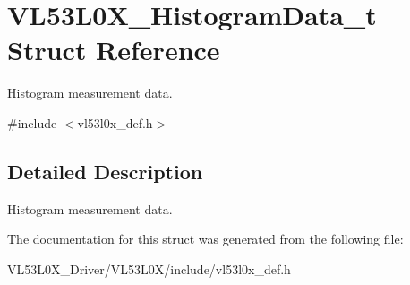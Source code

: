 \hypertarget{structVL53L0X__HistogramData__t}{}\section{V\+L53\+L0\+X\+\_\+\+Histogram\+Data\+\_\+t Struct Reference}
\label{structVL53L0X__HistogramData__t}


Histogram measurement data.  




{\ttfamily \#include $<$vl53l0x\+\_\+def.\+h$>$}



\subsection{Detailed Description}
Histogram measurement data. 

The documentation for this struct was generated from the following file\+:\begin{DoxyCompactItemize}
\item 
V\+L53\+L0\+X\+\_\+\+Driver/\+V\+L53\+L0\+X/include/vl53l0x\+\_\+def.\+h\end{DoxyCompactItemize}
